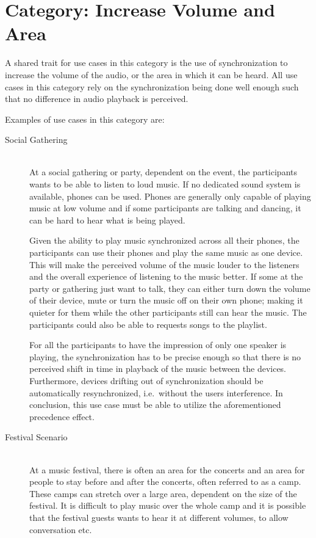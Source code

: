 \section{Category: Increase Volume and Area}\label{sec:category_increase_volume_and_area}
A shared trait for use cases in this category is the use of synchronization to increase the volume of the audio, or the area in which it can be heard.
All use cases in this category rely on the synchronization being done well enough such that no difference in audio playback is perceived.

Examples of use cases in this category are:
\begin{description}
    \item[Social Gathering] \hfill\\
        At a social gathering or party, dependent on the event, the participants wants to be able to listen to loud music.
        If no dedicated sound system is available, phones can be used.
        Phones are generally only capable of playing music at low volume and if some participants are talking and dancing, it can be hard to hear what is being played.

        Given the ability to play music synchronized across all their phones, the participants can use their phones and play the same music as one device.
        This will make the perceived volume of the music louder to the listeners and the overall experience of listening to the music better.
        If some at the party or gathering just want to talk, they can either turn down the volume of their device, mute or turn the music off on their own phone;
        making it quieter for them while the other participants still can hear the music.
        The participants could also be able to requests songs to the playlist.

        For all the participants to have the impression of only one speaker is playing,
        the synchronization has to be precise enough so that there is no perceived shift in time in playback of the music between the devices.
        Furthermore, devices drifting out of synchronization should be automatically resynchronized, i.e.\ without the users interference.
        In conclusion, this use case must be able to utilize the aforementioned precedence effect.

    \item[Festival Scenario] \hfill\\
        At a music festival, there is often an area for the concerts and an area for people to stay before and after the concerts, often referred to as a camp.
        These camps can stretch over a large area, dependent on the size of the festival.
        It is difficult to play music over the whole camp and it is possible that the festival guests wants to hear it at different volumes, to allow conversation etc.


\end{description}
